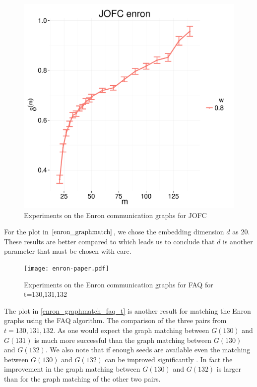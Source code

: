 \documentclass[12pt,oneside,final]{thesis}
\begin{document}
\begin{figure}
\includegraphics[scale=0.75]{JOFC-enron_dim_20}
\caption{Experiments on the Enron communication graphs for JOFC \label{enron_graphmatch}}
\end{figure}

For the plot in  $\ref{enron_graphmatch}$, we chose the embedding dimension $d$ as 20. These results are better compared to \label{enron_graphmatch_faq_jofc} which leads us to conclude that $d$ is another parameter that must be chosen with care. 


\begin{figure}
\texttt{[image: enron-paper.pdf]}
\caption{Experiments on the Enron communication graphs for FAQ for t=130,131,132 \label{enron_graphmatch_faq_t}}
\end{figure}
The plot in \autoref{enron_graphmatch_faq_t} is another result for matching the Enron graphs using the FAQ algorithm. The comparison of the three pairs from $t=130,131,132$. As one would expect the graph matching between $G(130)$ and $G(131)$ is much more successful than    the graph matching between $G(130)$ and $G(132)$. We also note that if enough seeds are available even the matching between  $G(130)$ and $G(132)$ can be improved significantly . In fact the improvement in the graph matching between  $G(130)$ and $G(132)$  is larger than for the graph matching of the other two pairs.
\end{document}
